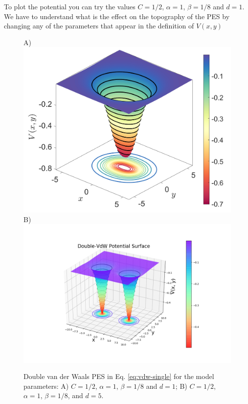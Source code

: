 \documentclass[10pt,aps,onecolumn,superscriptaddress]{revtex4-2}
\begin{document}
To plot the potential you can try the values $C = 1/2$, $\alpha = 1$, $\beta = 1/8$ and $d = 1$. We have to understand what is the effect on the topography of the PES by changing any of the parameters that appear in the definition of $V(x,y)$

\begin{figure}[htbp]
    A)\includegraphics[scale=0.26]{CirquePES_c_1div2_a_1_b_1div8_d_1.png}
    B)\includegraphics[scale=0.32]{double-vdw_surface.png}
    \caption{Double van der Waals PES in Eq. \eqref{eq:vdw-single} for the model parameters: A) $C = 1/2$, $\alpha = 1$, $\beta = 1/8$ and $d = 1$; B) $C = 1/2$, $\alpha = 1$, $\beta = 1/8$, and $d = 5$.}
    \label{fig:vdw-single_surface}
\end{figure}
\end{document}
